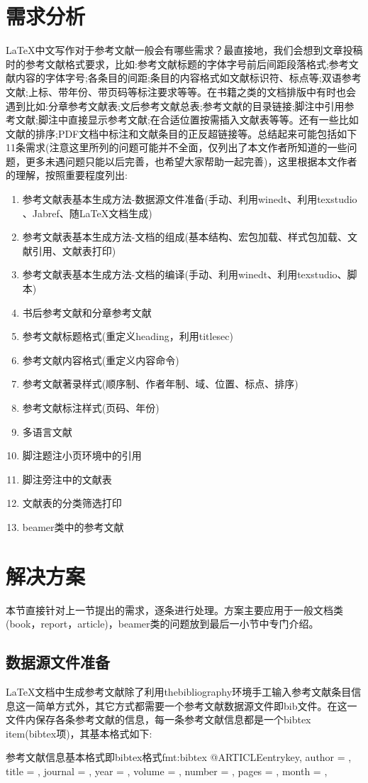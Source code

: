 \documentclass[twoside]{article} %
\begin{document}
\section{需求分析}
\LaTeX 中文写作对于参考文献一般会有哪些需求？最直接地，我们会想到文章投稿时的参考文献格式要求，比如:参考文献标题的字体字号前后间距段落格式;参考文献内容的字体字号;各条目的间距;条目的内容格式如文献标识符、标点等;双语参考文献;上标、带年份、带页码等标注要求等等。在书籍之类的文档排版中有时也会遇到比如:分章参考文献表;文后参考文献总表;参考文献的目录链接;脚注中引用参考文献;脚注中直接显示参考文献;在合适位置按需插入文献表等等。还有一些比如文献的排序;PDF文档中标注和文献条目的正反超链接等。总结起来可能包括如下11条需求(注意这里所列的问题可能并不全面，仅列出了本文作者所知道的一些问题，更多未遇问题只能以后完善，也希望大家帮助一起完善)，这里根据本文作者的理解，按照重要程度列出:
\begin{enumerate}
  \item 参考文献表基本生成方法-数据源文件准备(手动、利用winedt、利用texstudio 、Jabref、随\LaTeX 文档生成)
  \item 参考文献表基本生成方法-文档的组成(基本结构、宏包加载、样式包加载、文献引用、文献表打印)
  \item 参考文献表基本生成方法-文档的编译(手动、利用winedt、利用texstudio、脚本)
  \item 书后参考文献和分章参考文献
  \item 参考文献标题格式(重定义heading，利用titlesec)
  \item 参考文献内容格式(重定义内容命令)
  \item 参考文献著录样式(顺序制、作者年制、域、位置、标点、排序)
  \item 参考文献标注样式(页码、年份)
  \item 多语言文献
  \item 脚注题注小页环境中的引用
  \item 脚注旁注中的文献表
  \item 文献表的分类筛选打印
  \item beamer类中的参考文献
\end{enumerate}

\section{解决方案}
本节直接针对上一节提出的需求，逐条进行处理。方案主要应用于一般文档类(book，report，article)，beamer类的问题放到最后一小节中专门介绍。
\subsection{数据源文件准备}
\LaTeX 文档中生成参考文献除了利用thebibliography环境手工输入参考文献条目信息这一简单方式外，其它方式都需要一个参考文献数据源文件即bib文件。在这一文件内保存各条参考文献的信息，每一条参考文献信息都是一个bibtex item(bibtex项)，其基本格式如下:
\begin{codetex}{参考文献信息基本格式即bibtex格式}{fmt:bibtex}
@ARTICLE{entrykey,
  author =       {},
  title =        {},
  journal =      {},
  year =         {},
  volume =       {},
  number =       {},
  pages =        {},
  month =        {},
}
\end{codetex}
\end{document}
